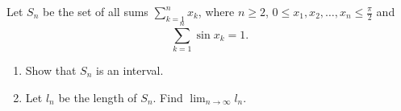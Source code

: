 \documentclass{article}
\begin{document}
\setlength{\parindent}{0pt}
Let $S_{n}$ be the set of all sums $\sum_{k=1}^{n}x_{k}$, where $n\ge2$, $0\le x_{1},x_{2},\dots,x_{n}\le\frac{\pi}{2}$ and$$\sum_{k=1}^{n}\sin x_{k}=1.$$
\begin{enumerate}[label=\alph*)]
\item Show that $S_{n}$ is an interval.
\item Let $l_{n}$ be the length of $S_{n}$. Find $\lim_{n\to\infty}l_{n}$.
\end{enumerate}
\end{document}
